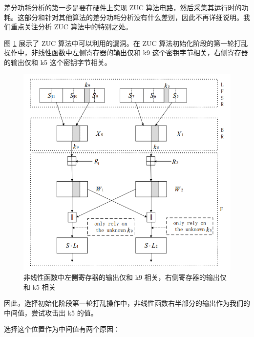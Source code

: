 \vspace*{0.5\baselineskip}

差分功耗分析的第一步是要在硬件上实现 ZUC 算法电路，然后采集其运行时的功耗。这部分和针对其他算法的差分功耗分析没有什么差别，因此不再详细说明。我们重点关注分析 ZUC 算法中的特别之处。

\vspace*{0.5\baselineskip}

图 \ref{fig:zuc_attack} 展示了 ZUC 算法中可以利用的漏洞。在 ZUC 算法初始化阶段的第一轮打乱操作中，非线性函数中左侧寄存器的输出仅和 k9 这个密钥字节相关，右侧寄存器的输出仅和 k5 这个密钥字节相关。 \cite{zuc_attack_tangming}

\begin{figure}[htbp]
    \centering
    \includegraphics[height=.5\textheight]{../images/zuc_attack.png}
    \caption{非线性函数中左侧寄存器的输出仅和 k9 相关，右侧寄存器的输出仅和 k5 相关\cite{zuc_attack_tangming}}
    \label{fig:zuc_attack}

\end{figure}

因此，选择初始化阶段第一轮打乱操作中，非线性函数右半部分的输出作为我们的中间值，尝试攻击出 k5 的值。

\vspace*{\baselineskip}

\newpage

选择这个位置作为中间值有两个原因：


